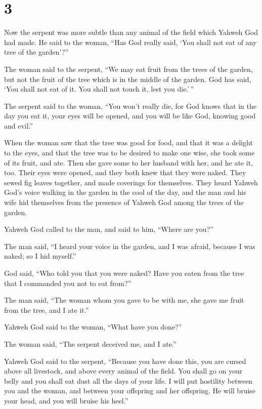 \hypertarget{section-2}{%
\section{3}\label{section-2}}

 Now the serpent was more subtle than any animal of the
field which Yahweh God had made. He said to the woman, ``Has God really
said, `You shall not eat of any tree of the garden'?''

 The woman said to the serpent, ``We may eat fruit from the
trees of the garden,  but not the fruit of the tree which is
in the middle of the garden. God has said, `You shall not eat of it. You
shall not touch it, lest you die.'\,''

 The serpent said to the woman, ``You won't really die,
 for God knows that in the day you eat it, your eyes will be
opened, and you will be like God, knowing good and evil.''

 When the woman saw that the tree was good for food, and
that it was a delight to the eyes, and that the tree was to be desired
to make one wise, she took some of its fruit, and ate. Then she gave
some to her husband with her, and he ate it, too.  Their
eyes were opened, and they both knew that they were naked. They sewed
fig leaves together, and made coverings for themselves. 
They heard Yahweh God's voice walking in the garden in the cool of the
day, and the man and his wife hid themselves from the presence of Yahweh
God among the trees of the garden.

 Yahweh God called to the man, and said to him, ``Where are
you?''

 The man said, ``I heard your voice in the garden, and I
was afraid, because I was naked; so I hid myself.''

 God said, ``Who told you that you were naked? Have you
eaten from the tree that I commanded you not to eat from?''

 The man said, ``The woman whom you gave to be with me, she
gave me fruit from the tree, and I ate it.''

 Yahweh God said to the woman, ``What have you done?''

The woman said, ``The serpent deceived me, and I ate.''

 Yahweh God said to the serpent, ``Because you have done
this, you are cursed above all livestock, and above every animal of the
field. You shall go on your belly and you shall eat dust all the days of
your life.  I will put hostility between you and the woman,
and between your offspring and her offspring. He will bruise your head,
and you will bruise his heel.''


